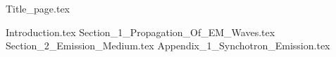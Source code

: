 \documentclass[a4paper,11pt]{article}
\numberwithin{equation}{section}
\numberwithin{figure}{section}
\begin{document}
\lfoot{}
{Title_page.tex}
\lfoot{}
\tableofcontents
\listoffigures
\newpage
\lfoot{}
{Introduction.tex}
\newpage
\lfoot{}
{Section_1_Propagation_Of_EM_Waves.tex}
\newpage
\lfoot{}
{Section_2_Emission_Medium.tex}
\newpage
\lfoot{}
\newpage
{Appendix_1_Synchotron_Emission.tex}
\lfoot{}
\end{document}
